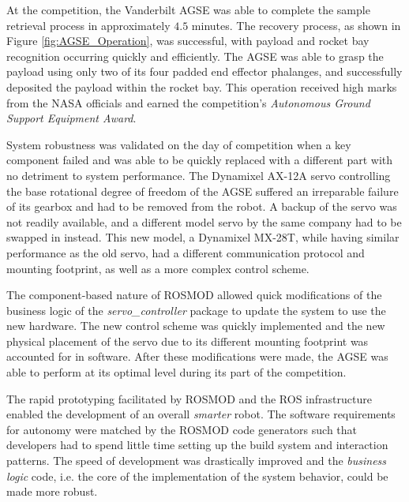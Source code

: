 At the competition, the Vanderbilt AGSE was able to complete the sample retrieval process in approximately $4.5$ minutes. The recovery process, as shown in Figure \ref{fig:AGSE_Operation}, was successful, with payload and rocket bay recognition occurring quickly and efficiently. The AGSE was able to grasp the payload using only two of its four padded end effector phalanges, and successfully deposited the payload within the rocket bay. This operation received high marks from the NASA officials and earned the competition's \emph{Autonomous Ground Support Equipment Award}.

System robustness was validated on the day of competition when a key component failed and was able to be quickly replaced with a different part with no detriment to system performance. The Dynamixel AX-12A servo controlling the base rotational degree of freedom of the AGSE suffered an irreparable failure of its gearbox and had to be removed from the robot. A backup of the servo was not readily available, and a different model servo by the same company had to be swapped in instead.  This new model, a Dynamixel MX-28T, while having similar performance as the old servo, had a different communication protocol and mounting footprint, as well as a more complex control scheme.

The component-based nature of ROSMOD allowed quick modifications of the business logic of the \emph{servo\_controller} package to update the system to use the new hardware.  The new control scheme was quickly implemented and the new physical placement of the servo due to its different mounting footprint was accounted for in software. After these modifications were made, the AGSE was able to perform at its optimal level during its part of the competition.

The rapid prototyping facilitated by ROSMOD and the ROS infrastructure enabled the development of an overall \emph{smarter} robot. The software requirements for autonomy were matched by the ROSMOD code generators such that developers had to spend little time setting up the build system and interaction patterns. The speed of development was drastically improved and the \emph{business logic} code, i.e. the core of the implementation of the system behavior, could be made more robust.


